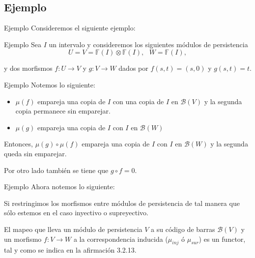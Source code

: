 \documentclass{beamer}
\begin{document}
\subsection{Ejemplo}
\begin{frame}{Ejemplo}
    Consideremos el siguiente ejemplo:
    \begin{block}{Ejemplo}
        Sea $I$ un intervalo y consideremos los siguientes módulos de persistencia
        $$U = V = \mathbb{F}(I) \otimes \mathbb{F}(I), \textit{   } W = \mathbb{F}(I),$$

        y dos morfismos $f:U\to V$ y $g:V \to W$ dados por $f(s, t)=(s, 0)$ y $g(s, t) = t$.
    \end{block}
\end{frame}

\begin{frame}{Ejemplo}
    Notemos lo siguiente:
    \begin{itemize}
        \item $\mu(f)$ empareja una copia de $I$ con una copia de $I$ en $\mathcal{B}(V)$ y la segunda copia permanece sin emparejar.
        \item $\mu(g)$ empareja una copia de $I$ con $I$ en $\mathcal{B}(W)$
    \end{itemize}
    \pause

    Entonces, $\mu(g)\circ \mu(f)$ empareja una copia de $I$ con $I$ en $\mathcal{B}(W)$ y la segunda queda sin emparejar. 
    \newline
    \pause

    Por otro lado también se tiene que $g\circ f=0$.
\end{frame}

\begin{frame}{Ejemplo}
    Ahora notemos lo siguiente:
    \newline
    \pause 

    Si restringimos los morfismos entre módulos de persistencia de tal manera que sólo estemos en el caso inyectivo o supreyectivo.  
    \newline
    \pause
    
    El mapeo que lleva un módulo de persistencia $V$ a su código de barras $\mathcal{B}(V)$ y un morfismo $f:V\to W$ a la correspondencia inducida ($\mu_{inj}$ ó $\mu_{sur}$) es un functor, tal y como se indica en la afirmación 3.2.13.
    
\end{frame}
\end{document}
